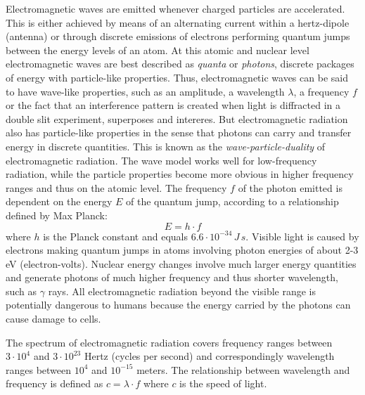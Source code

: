 Electromagnetic waves are emitted whenever charged particles are accelerated. This is either achieved by means of an alternating current within a hertz-dipole (antenna) or through discrete emissions of electrons performing quantum jumps between the energy levels of an atom. At this atomic and nuclear level electromagnetic waves are best described as \emph{quanta} or \emph{photons}, discrete packages of energy with particle-like properties. Thus, electromagnetic waves can be said to have wave-like properties, such as an amplitude, a wavelength $\lambda$, a frequency $f$ or the fact that an interference pattern is created when light is diffracted in a double slit experiment, superposes and intereres. But electromagnetic radiation also has particle-like properties in the sense that photons can carry and transfer energy in discrete quantities. This is known as the \emph{wave-particle-duality} of electromagnetic radiation. The wave model works well for low-frequency radiation, while the particle properties become more obvious in higher frequency ranges and thus on the atomic level. The frequency $f$ of the photon emitted is dependent on the energy $E$ of the quantum jump, according to a relationship defined by Max Planck: $$E = h \cdot f$$ where $h$ is the Planck constant and equals $6.6 \cdot 10^{-34} \, J\, s$. Visible light is caused by electrons making quantum jumps in atoms involving photon energies of about 2-3 eV (electron-volts). Nuclear energy changes involve much larger energy quantities and generate photons of much higher frequency and thus shorter wavelength, such as $\gamma$ rays. All electromagnetic radiation beyond the visible range is potentially dangerous to humans because the energy carried by the photons can cause damage to cells.

\pagebreak


The spectrum of electromagnetic radiation covers frequency ranges between $3 \cdot 10^4$ and $3 \cdot 10^{23}$ Hertz (cycles per second) and correspondingly wavelength ranges between $10^4$ and $10^{-15}$ meters. The relationship between wavelength and frequency is defined as $c = \lambda \cdot f$ where $c$ is the speed of light.

